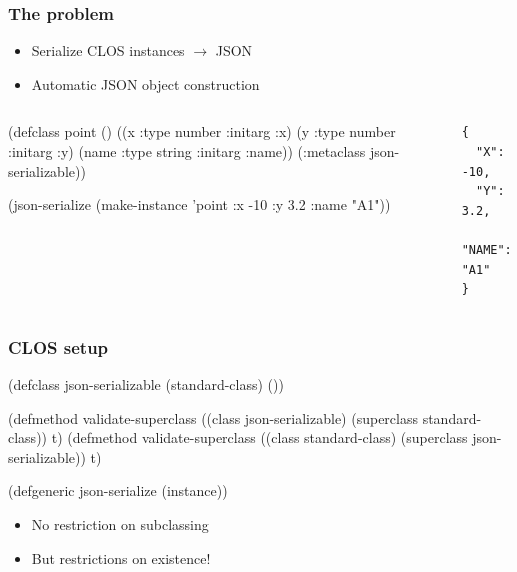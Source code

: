 \documentclass[aspectratio=169]{beamer}
\newcommand\rarr{\ensuremath{\rightarrow}}
\begin{document}
\begin{frame}[fragile]
  \frametitle{The problem}
  \begin{itemize}
  \item Serialize CLOS instances \rarr{} JSON
  \item Automatic JSON object construction
  \end{itemize}

  \begin{columns}
    \column{.55\paperwidth}
\begin{clcode}
(defclass point ()
  ((x :type number
      :initarg :x)
   (y :type number
      :initarg :y)
   (name :type string
         :initarg :name))
  (:metaclass json-serializable))

(json-serialize (make-instance 'point :x -10 :y 3.2 :name "A1"))
\end{clcode}

    \pause

    \column{.4\paperwidth}
  \begin{mintedcodebox}[title=JSON serialization,icon=\faOpera,compact]
\begin{verbatim}
{
  "X": -10,
  "Y": 3.2,
  "NAME": "A1"
}
\end{verbatim}
  \end{mintedcodebox}
\end{columns}
\end{frame}

\begin{frame}[fragile]
  \frametitle{CLOS setup}
\begin{clcode}
(defclass json-serializable (standard-class)
  ())

(defmethod validate-superclass
    ((class json-serializable) (superclass standard-class))
  t)
(defmethod validate-superclass
    ((class standard-class) (superclass json-serializable))
  t)

(defgeneric json-serialize (instance))
\end{clcode}

  \pause
  \begin{itemize}
  \item No restriction on subclassing
  \item But restrictions on existence!
  \end{itemize}
\end{frame}
\end{document}
